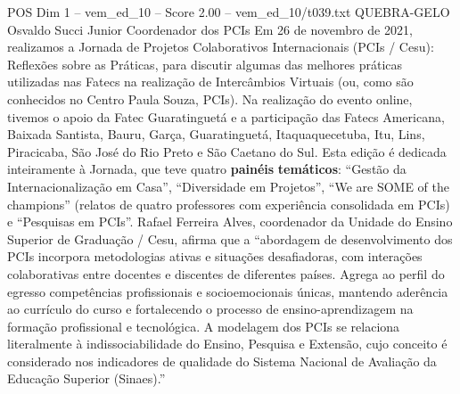 \begin{textsample}{POS Dim 1 – vem\_ed\_10 – Score 2.00 – vem\_ed\_10/t039.txt}  \label{ex:f1_pos_019}
QUEBRA-GELO Osvaldo Succi Junior Coordenador dos PCIs Em 26 de novembro de 2021, realizamos a Jornada de Projetos Colaborativos Internacionais (PCIs / Cesu): Reflexões sobre as Práticas, para discutir algumas das melhores práticas utilizadas nas Fatecs na realização de Intercâmbios Virtuais (ou, como são conhecidos no Centro Paula Souza, PCIs).
Na realização do evento online, tivemos o apoio da Fatec Guaratinguetá e a participação das Fatecs Americana, Baixada Santista, Bauru, Garça, Guaratinguetá, Itaquaquecetuba, Itu, Lins, Piracicaba, São José do Rio Preto e São Caetano do Sul.
Esta edição é dedicada inteiramente à Jornada, que teve quatro \textbf{painéis} \textbf{temáticos}: “Gestão da Internacionalização em Casa”, “Diversidade em Projetos”, “We are SOME of the champions” (relatos de quatro professores com experiência consolidada em PCIs) e “Pesquisas em PCIs”.
Rafael Ferreira Alves, coordenador da Unidade do Ensino Superior de Graduação / Cesu, afirma que a “abordagem de desenvolvimento dos PCIs incorpora metodologias ativas e situações desafiadoras, com interações colaborativas entre docentes e discentes de diferentes países.
Agrega ao perfil do egresso competências profissionais e socioemocionais únicas, mantendo aderência ao currículo do curso e fortalecendo o processo de ensino-aprendizagem na formação profissional e tecnológica.
A modelagem dos PCIs se relaciona literalmente à indissociabilidade do Ensino, Pesquisa e Extensão, cujo conceito é considerado nos indicadores de qualidade do Sistema Nacional de Avaliação da Educação Superior (Sinaes).”

\end{textsample}
